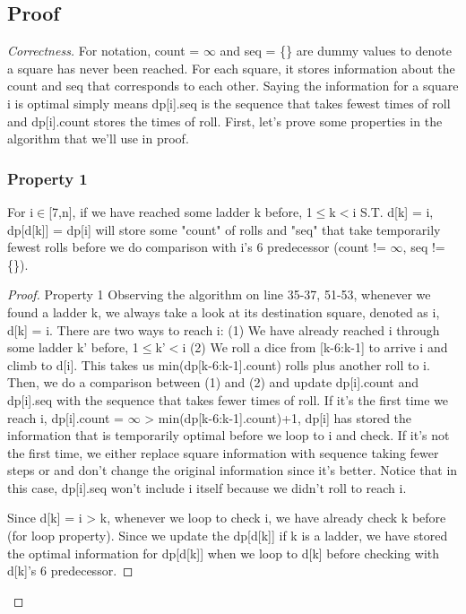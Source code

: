 \documentclass[openany]{article}
\begin{document}
\subsection*{Proof}
\begin{proof}[Correctness]{}
    For notation, count = $\infty$ and seq = \{\} are dummy values to denote a square has never been reached. For each square, it stores information about the count and seq that corresponds to each other. Saying the information for a square i is optimal simply means dp[i].seq is the sequence that takes fewest times of roll and dp[i].count stores the times of roll. First, let's prove some properties in the algorithm that we'll use in proof.
\subsubsection*{Property 1}
    For i$\in$[7,n], if we have reached some ladder k before, 1$\leq$k$<$i S.T. d[k] = i, dp[d[k]] = dp[i] will store some "count" of rolls and "seq" that take temporarily fewest rolls before we do comparison with i's 6 predecessor (count != $\infty$, seq != \{\}).
    \begin{proof}{Property 1}
         Observing the algorithm on line 35-37, 51-53, whenever we found a ladder k, we always take a look at its destination square, denoted as i, d[k] = i. There are two ways to reach i: (1) We have already reached i through some ladder k' before, 1$\leq$k'$<$i (2) We roll a dice from [k-6:k-1] to arrive i and climb to d[i]. This takes us min(dp[k-6:k-1].count) rolls plus another roll to i. Then, we do a comparison between (1) and (2) and update dp[i].count and dp[i].seq with the sequence that takes fewer times of roll. If it's the first time we reach i, dp[i].count = $\infty$ > min(dp[k-6:k-1].count)+1, dp[i] has stored the information that is temporarily optimal before we loop to i and check. If it's not the first time, we either replace square information with sequence taking fewer steps or and don't change the original information since it's better. Notice that in this case, dp[i].seq won't include i itself because we didn't roll to reach i.
         
         Since d[k] = i > k, whenever we loop to check i, we have already check k before (for loop property). Since we update the dp[d[k]] if k is a ladder, we have stored the optimal information for dp[d[k]] when we loop to d[k] before checking with d[k]'s 6 predecessor.
    \end{proof}


\end{proof}
\end{document}
